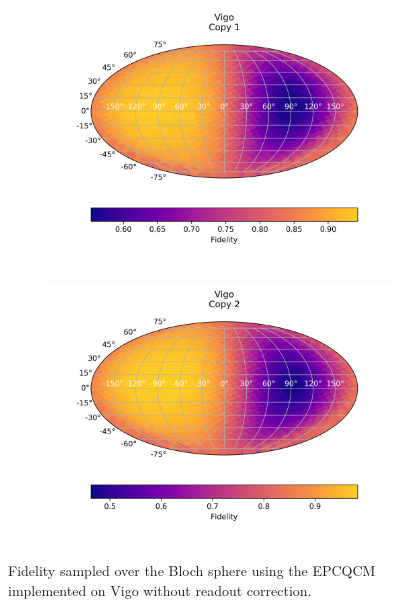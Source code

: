   \begin{figure}[H]
    \centering
    \begin{subfigure}{.5\textwidth}
      \centering
      \includegraphics[width=\textwidth]{Figures/Economical/IBM/FullSphere/results_vigo_copy1.png}
      
      \label{fig:epc_uncorrected_vigo_sphere_1}
    \end{subfigure}%
    \begin{subfigure}{.5\textwidth}
      \centering
      \includegraphics[width=\textwidth]{Figures/Economical/IBM/FullSphere/results_vigo_copy2.png}
      
      \label{fig:epc_uncorrected_vigo_sphere_2}
    \end{subfigure}
    \caption{Fidelity sampled over the Bloch sphere using the EPCQCM implemented on Vigo without readout correction.}
    \label{fig:epc_uncorrected_vigo_sphere}
  \end{figure}
  
